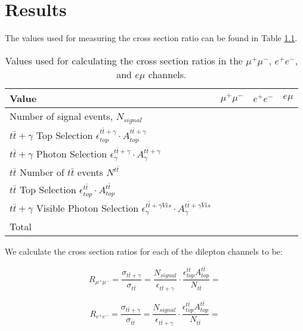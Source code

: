\chapter{Results} \label{chap-Results}

The values used for measuring the cross section ratio can be found in Table \ref{tab-xsectvariables}.

\begin{table}[h!]
\begin{center}
\begin{tabular}{l|c|c|c}
\hline
\hline
	\textbf{Value} & $\mu^+\mu^-$ & $e^+e^-$ & $e\mu$ \\
\hline
	Number of signal events, $N_{signal}$ & & & \\
	$t\bar{t}+\gamma$ Top Selection $\epsilon^{t\bar{t}+\gamma}_{top} \cdot A^{t\bar{t}+\gamma}_{top}$ & & & \\
	$t\bar{t}+\gamma$ Photon Selection $\epsilon^{t\bar{t}+\gamma}_{\gamma} \cdot A^{t\bar{t}+\gamma}_{\gamma}$ & & & \\
	$t\bar{t}$ Number of $t\bar{t}$ events $N^{t\bar{t}}$ & & & \\
	$t\bar{t}$ Top Selection $\epsilon^{t\bar{t}}_{top} \cdot A^{t\bar{t}}_{top}$ & & & \\
	$t\bar{t}+\gamma$ Visible Photon Selection $\epsilon^{t\bar{t}+\gamma Vis}_{\gamma} \cdot A^{t\bar{t}+\gamma Vis}_{\gamma}$ & & & \\
\hline
	Total & & & \\
\hline
\hline
\end{tabular} 
\end{center}
\caption{Values used for calculating the cross section ratios in the $\mu^+\mu^-$, $e^+e^-$, and $e\mu$ channels.}
\label{tab-xsectvariables}
\end{table}

We calculate the cross section ratios for each of the dilepton channels to be:

\begin{equation}
	R_{\mu^+\mu^-} = \frac{\sigma_{t\bar{t}+\gamma}}{\sigma_{t\bar{t}}} = \frac{N_{signal}}{\epsilon_{t\bar{t}+\gamma}} \cdot \frac{\epsilon^{t\bar{t}}_{top} A^{t\bar{t}}_{top}}{N_{t\bar{t}}} = 
\end{equation}

\begin{equation}
	R_{e^+e^-} = \frac{\sigma_{t\bar{t}+\gamma}}{\sigma_{t\bar{t}}} = \frac{N_{signal}}{\epsilon_{t\bar{t}+\gamma}} \cdot \frac{\epsilon^{t\bar{t}}_{top} A^{t\bar{t}}_{top}}{N_{t\bar{t}}} = 
\end{equation}

